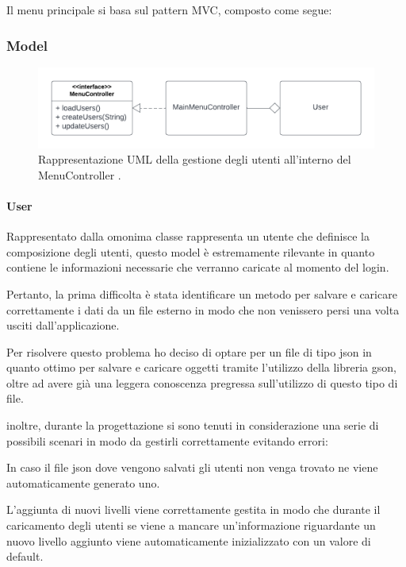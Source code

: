 \documentclass[a4paper,12pt]{report}
\begin{document}
    Il menu principale si basa sul pattern MVC, composto come segue:

    \subsubsection{Model}

    \begin{figure}[H]
        \centering{}
        \includegraphics[scale=0.7] {img/users.png}
        \caption{Rappresentazione UML della gestione degli utenti all'interno del MenuController .}
        \label{img:users}
    \end{figure}

    \paragraph{User} Rappresentato dalla omonima classe rappresenta un utente che definisce la composizione degli utenti, questo model è estremamente rilevante in quanto contiene le informazioni necessarie che verranno caricate al momento del login.

    Pertanto, la prima difficolta è stata identificare un metodo per salvare e caricare correttamente i dati da un file esterno in modo che non venissero persi una volta usciti dall’applicazione.

    Per risolvere questo problema ho deciso di optare per un file di tipo json in quanto ottimo per salvare e caricare oggetti tramite l’utilizzo della libreria gson, oltre ad avere già una leggera conoscenza pregressa sull’utilizzo di questo tipo di file.

    inoltre, durante la progettazione si sono tenuti in considerazione una serie di possibili scenari in modo da gestirli correttamente evitando errori:

    In caso il file json dove vengono salvati gli utenti non venga trovato ne viene automaticamente generato uno.

    L’aggiunta di nuovi livelli viene correttamente gestita in modo che durante il caricamento degli utenti se viene a mancare un’informazione riguardante un nuovo livello aggiunto viene automaticamente inizializzato con un valore di default.
\end{document}
